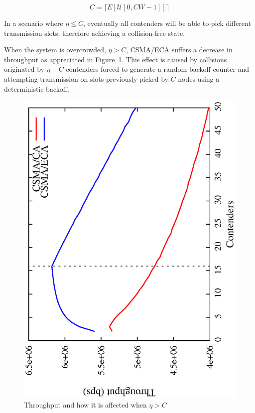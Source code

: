 
\begin{equation} \label{eq:capacity}	
	C = \lceil{E[\mathcal{U}[0, CW - 1]]}\rceil
\end{equation}

In a scenario where $\eta \leq C$, eventually all contenders will be able to pick different transmission slots, therefore achieving a collision-free state.

When the system is overcrowded, $\eta>C$, CSMA/ECA suffers a decrease in throughput as appreciated in Figure~\ref{fig:throughput}. This effect is caused by collisions originated by $\eta-C$ contenders forced to generate a random backoff counter and attempting transmission on slots previously picked by $C$ nodes using a deterministic backoff.


\begin{figure}[htbp]
  \centering
  \includegraphics[width=0.7\linewidth, angle = -90]{figures/throughput/throughput.eps}
  \caption{Throughput and how it is affected when $\eta > C$
  \label{fig:throughput}}
\end{figure}

